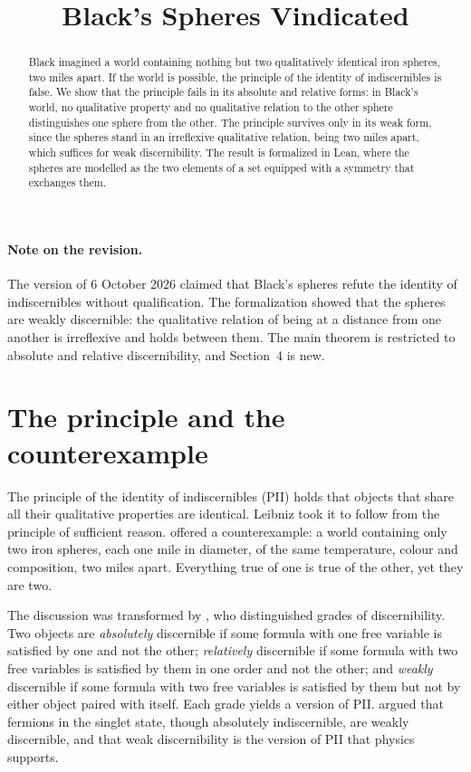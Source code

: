 \documentclass{situationist-preprint}
\title{Black's Spheres Vindicated}
\begin{document}
\maketitle

\begin{abstract}
Black imagined a world containing nothing but two qualitatively identical iron spheres, two miles apart. If the world is possible, the principle of the identity of indiscernibles is false. We show that the principle fails in its absolute and relative forms: in Black's world, no qualitative property and no qualitative relation to the other sphere distinguishes one sphere from the other. The principle survives only in its weak form, since the spheres stand in an irreflexive qualitative relation, being two miles apart, which suffices for weak discernibility. The result is formalized in Lean, where the spheres are modelled as the two elements of a set equipped with a symmetry that exchanges them.
\end{abstract}

\paragraph{Note on the revision.} The version of 6 October 2026 claimed that Black's spheres refute the identity of indiscernibles without qualification. The formalization showed that the spheres are weakly discernible: the qualitative relation of being at a distance from one another is irreflexive and holds between them. The main theorem is restricted to absolute and relative discernibility, and Section~4 is new.

\section{The principle and the counterexample}

The principle of the identity of indiscernibles (PII) holds that objects that share all their qualitative properties are identical. Leibniz took it to follow from the principle of sufficient reason. \citet{Black1952} offered a counterexample: a world containing only two iron spheres, each one mile in diameter, of the same temperature, colour and composition, two miles apart. Everything true of one is true of the other, yet they are two.

The discussion was transformed by \citet{Quine1976}, who distinguished grades of discernibility. Two objects are \emph{absolutely} discernible if some formula with one free variable is satisfied by one and not the other; \emph{relatively} discernible if some formula with two free variables is satisfied by them in one order and not the other; and \emph{weakly} discernible if some formula with two free variables is satisfied by them but not by either object paired with itself. Each grade yields a version of PII. \citet{Saunders2003,Saunders2006} argued that fermions in the singlet state, though absolutely indiscernible, are weakly discernible, and that weak discernibility is the version of PII that physics supports.
\end{document}

